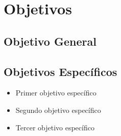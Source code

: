 \chapter{Objetivos}
\section{Objetivo General}


\section{Objetivos Específicos}


 \begin{itemize}
	\item Primer objetivo específico
	\item Segundo objetivo específico
	\item Tercer objetivo específico
 \end{itemize}
